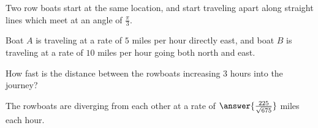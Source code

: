 \documentclass{ximera}
\author{Steven Gubkin}
\begin{document}
\begin{exercise}
  Two row boats start at the same location, and start traveling apart
  along straight lines which meet at an angle of $\frac{\pi}{3}$.


  Boat $A$ is traveling at a rate of $5$ miles per hour directly east,
  and boat $B$ is traveling at a rate of $10$ miles per hour going
  both north and east.

  How fast is the distance between the rowboats increasing $3$ hours
  into the journey?

\begin{prompt}
  The rowboats are diverging from each other at a rate of
  $\answer{\frac{225}{\sqrt{675}}}$ miles each hour.
\end{prompt}

\end{exercise}
\end{document}
